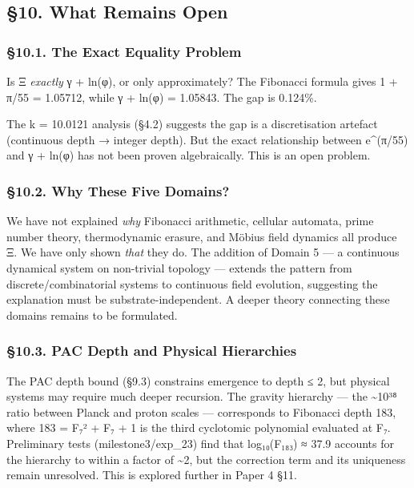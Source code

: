 \documentclass[
  11pt,
  a4paper]{article}
\begin{document}
\subsection{§10. What Remains Open}\label{what-remains-open}

\subsubsection{§10.1. The Exact Equality
Problem}\label{the-exact-equality-problem}

Is Ξ \emph{exactly} γ + ln(φ), or only approximately? The Fibonacci
formula gives 1 + π/55 = 1.05712, while γ + ln(φ) = 1.05843. The gap is
0.124\%.

The k = 10.0121 analysis (§4.2) suggests the gap is a discretisation
artefact (continuous depth → integer depth). But the exact relationship
between e\^{}(π/55) and γ + ln(φ) has not been proven algebraically.
This is an open problem.

\subsubsection{§10.2. Why These Five
Domains?}\label{why-these-five-domains}

We have not explained \emph{why} Fibonacci arithmetic, cellular
automata, prime number theory, thermodynamic erasure, and Möbius field
dynamics all produce Ξ. We have only shown \emph{that} they do. The
addition of Domain 5 --- a continuous dynamical system on non-trivial
topology --- extends the pattern from discrete/combinatorial systems to
continuous field evolution, suggesting the explanation must be
substrate-independent. A deeper theory connecting these domains remains
to be formulated.

\subsubsection{§10.3. PAC Depth and Physical
Hierarchies}\label{pac-depth-and-physical-hierarchies}

The PAC depth bound (§9.3) constrains emergence to depth ≤ 2, but
physical systems may require much deeper recursion. The gravity
hierarchy --- the \textasciitilde10³⁸ ratio between Planck and proton
scales --- corresponds to Fibonacci depth 183, where 183 = F₇² + F₇ + 1
is the third cyclotomic polynomial evaluated at F₇. Preliminary tests
(milestone3/exp\_23) find that log₁₀(F₁₈₃) ≈ 37.9 accounts for the
hierarchy to within a factor of \textasciitilde2, but the correction
term and its uniqueness remain unresolved. This is explored further in
Paper 4 §11.
\end{document}
